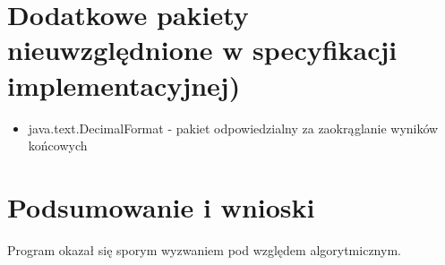 \documentclass[12pt]{article}
\begin{document}
\begin{enumerate}
\section{Dodatkowe pakiety nieuwzględnione w specyfikacji implementacyjnej)}
\begin{itemize}
\item java.text.DecimalFormat - pakiet odpowiedzialny za zaokrąglanie wyników końcowych
\end{itemize}

\section{Podsumowanie i wnioski}
Program okazał się sporym wyzwaniem pod względem algorytmicznym.

\end{enumerate}
\end{document}
